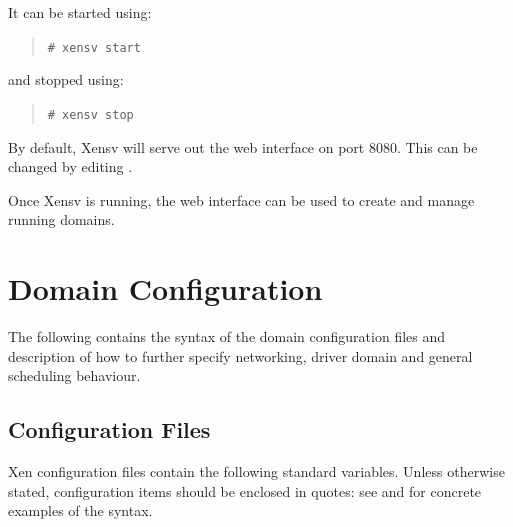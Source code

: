 \documentclass[11pt,twoside,final,openright]{report}
\begin{document}
{It can be started using:
\begin{quote}
\verb_# xensv start_
\end{quote}
and stopped using: 
\begin{quote}
\verb_# xensv stop_
\end{quote}

By default, Xensv will serve out the web interface on port 8080.  This
can be changed by editing 
.

Once Xensv is running, the web interface can be used to create and
manage running domains.




\chapter{Domain Configuration}
\label{cha:config}

The following contains the syntax of the domain configuration 
files and description of how to further specify networking, 
driver domain and general scheduling behaviour. 

\section{Configuration Files}
\label{s:cfiles}

Xen configuration files contain the following standard variables.
Unless otherwise stated, configuration items should be enclosed in
quotes: see  and  
for concrete examples of the syntax.

}
\end{document}
